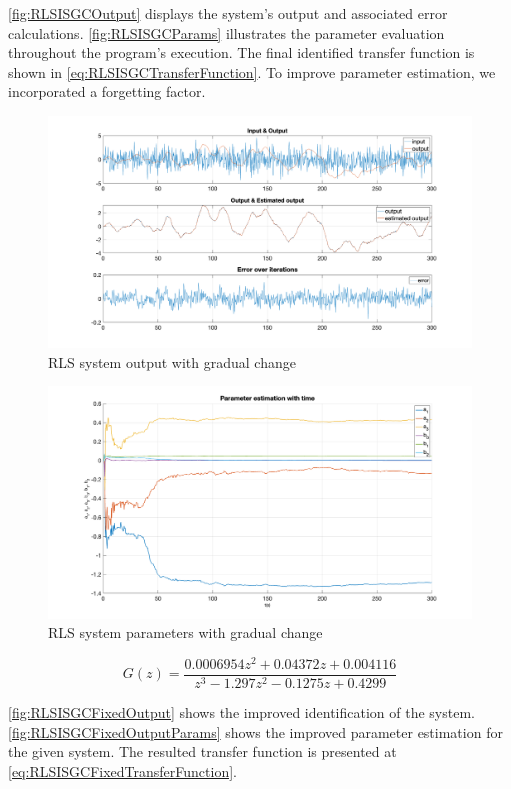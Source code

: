 \autoref{fig:RLSISGCOutput} displays the system's output and associated error calculations. \autoref{fig:RLSISGCParams} illustrates the parameter evaluation throughout the program's execution. The final identified transfer function is shown in \autoref{eq:RLSISGCTransferFunction}. To improve parameter estimation, we incorporated a forgetting factor.

\begin{figure}
	\centering
	\includegraphics[totalheight=8cm]{images/RLSISGCOutput.png}
	\caption{RLS system output with gradual change}
	\label{fig:RLSISGCOutput}
\end{figure}
\begin{figure}
	\centering
	\includegraphics[totalheight=8cm]{images/RLSISGCParams.png}
	\caption{RLS system parameters with gradual change}
	\label{fig:RLSISGCParams}
\end{figure}
\begin{equation}
	G(z) =	\frac{0.0006954 z^2 + 0.04372 z + 0.004116}{z^3 - 1.297 z^2 - 0.1275 z + 0.4299}
	\label{eq:RLSISGCTransferFunction}
\end{equation}

\autoref{fig:RLSISGCFixedOutput} shows the improved identification of the system. \autoref{fig:RLSISGCFixedOutputParams} shows the improved parameter estimation for the given system. The resulted transfer function is presented at \autoref{eq:RLSISGCFixedTransferFunction}. 

